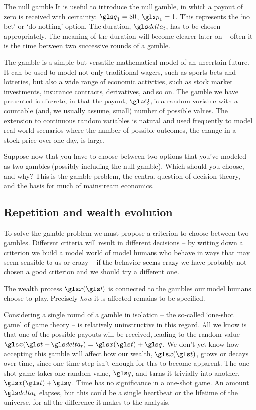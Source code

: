\begin{example}{The null gamble}
It is useful to introduce the null gamble, in which a payout of zero is received 
with certainty: $\q_1=\$0$, $\p_1=1$. This represents the `no bet' or `do nothing' option.
The duration, $\dt$, has to be chosen appropriately. The meaning of the
duration will become clearer later on -- often it is the time between two successive rounds
of a gamble.
\end{example}

The gamble is a simple but versatile mathematical model of an uncertain future. 
It can be used to model not only traditional wagers, such as sports bets and 
lotteries, but also a wide range of economic activities, such as stock market 
investments, insurance contracts, derivatives, and so on. The gamble we have 
presented is discrete, in that the payout, $\Q$, is a random variable with a 
countable (and, we usually assume, small) number of possible values. 
The extension to continuous random variables is natural and used frequently 
to model real-world scenarios where the number of possible outcomes, \eg the change 
in a stock price over one day, is large.

Suppose now that you have to choose between two options that you've modeled 
as two gambles (possibly including the null gamble). Which should you choose, 
and why? This is the gamble problem, the central question of decision theory, and 
the basis for much of mainstream economics.

\subsection{Repetition and wealth evolution}
To solve the gamble problem we must propose a criterion to choose between two
gambles. Different criteria will result in different decisions -- by writing down a criterion
we build a model world of model humans who behave in ways that may seem sensible
to us or crazy -- if the behavior seems crazy we have probably not chosen a good
criterion and we should try a different one.

The wealth process $\x(\t)$ is connected to the gambles our model humans 
choose to play. Precisely {\it how} it is affected remains to be specified.

Considering a single round of a gamble in isolation -- the so-called `one-shot 
game' of game theory -- is relatively uninstructive in this regard. All we know is 
that one of the possible payouts will be received, leading to the random value 
$\x(\t+\dt)=\x(\t)+\q$. 
We don't yet know how accepting this gamble will affect how our wealth, $\x(\t)$, grows or decays over time, since one time step isn't enough for this to become apparent. 
The one-shot game takes one random value, $\q$, and turns it trivially into 
another, $\x(\t)+\q$. Time has no significance in a 
one-shot game. An amount $\dt$ elapses, but this could be a single 
heartbeat or the lifetime of the universe, for all the difference it makes to the analysis.

